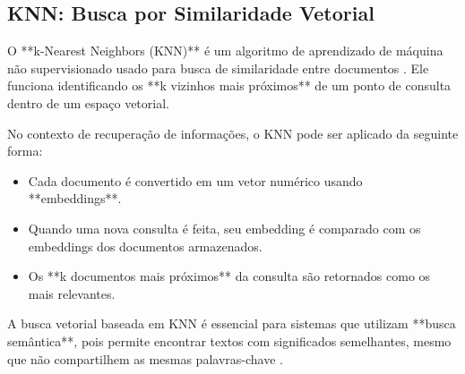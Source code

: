 \subsection{KNN: Busca por Similaridade Vetorial}

O **k-Nearest Neighbors (KNN)** é um algoritmo de aprendizado de máquina não supervisionado usado para busca de similaridade entre documentos \cite{fix1951discriminatory}. Ele funciona identificando os **k vizinhos mais próximos** de um ponto de consulta dentro de um espaço vetorial.

No contexto de recuperação de informações, o KNN pode ser aplicado da seguinte forma:
\begin{itemize}
    \item Cada documento é convertido em um vetor numérico usando **embeddings**.
    \item Quando uma nova consulta é feita, seu embedding é comparado com os embeddings dos documentos armazenados.
    \item Os **k documentos mais próximos** da consulta são retornados como os mais relevantes.
\end{itemize}

A busca vetorial baseada em KNN é essencial para sistemas que utilizam **busca semântica**, pois permite encontrar textos com significados semelhantes, mesmo que não compartilhem as mesmas palavras-chave \cite{vaswani2017attention}.